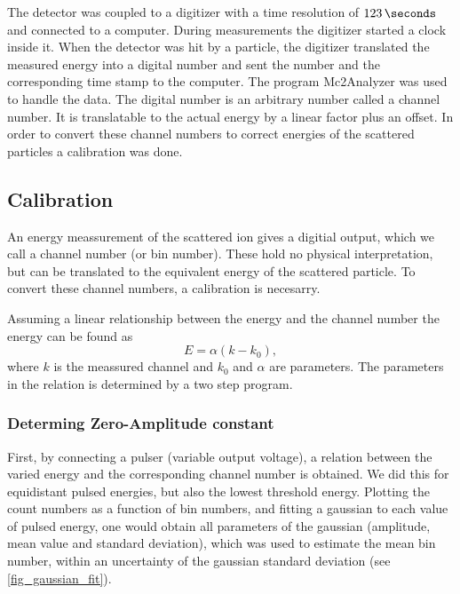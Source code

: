 The detector was coupled to a digitizer with a time resolution of
$\SI{123}{\seconds}$  and  connected to a computer. During
measurements the digitizer started a clock inside it. When the detector was hit
by a particle, the digitizer translated the measured energy into a digital
number and sent the number and the corresponding time stamp to the computer.
The program Mc2Analyzer was used to handle the data. The digital number is an
arbitrary number called a channel number. It is translatable to the actual
energy by a linear factor plus an offset. In order to convert these channel
numbers to correct energies of the scattered particles a calibration was done.

\subsection{Calibration}
An energy meassurement of the scattered ion gives a digitial output, which we call
a channel number (or bin number). These hold no physical interpretation, but
can be translated to the equivalent energy of the scattered particle. To
convert these channel numbers, a calibration is necesarry. 

Assuming a linear relationship between the energy and the channel number the
energy can be found as
\begin{equation}
E = \alpha(k - k_0),
\end{equation}
where $k$ is the meassured channel and $k_0$ and $\alpha$ are parameters. The
parameters in the relation is determined by a two step program.

\subsubsection{Determing Zero-Amplitude constant}
First, by connecting a pulser (variable output voltage), a relation between the
varied energy and the corresponding channel number is obtained. 
We did this for equidistant pulsed energies, but also the lowest threshold
energy. Plotting the count numbers as a function of bin numbers, and fitting a
gaussian to each value of pulsed energy, one would obtain all parameters of the
gaussian (amplitude, mean value and standard deviation), which was used to
estimate the mean bin number, within an uncertainty of the gaussian standard deviation (see
\cref{fig_gaussian_fit}). 

